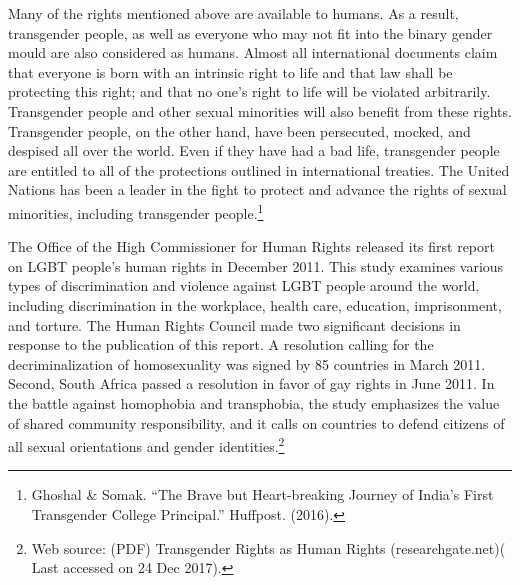 \begin{multicols}{2}


\vspace{-.15cm}

\noi
Many of the rights mentioned above are available to humans. As a result, transgender people,
as well as everyone who may not fit into the binary gender mould are also considered as
humans. Almost all international documents claim that everyone is born with an intrinsic right
to life and that law shall be protecting this right; and that no one's right to life will be violated
arbitrarily. Transgender people and other sexual minorities will also benefit from these rights.
Transgender people, on the other hand, have been persecuted, mocked, and despised all over
the world. Even if they have had a bad life, transgender people are entitled to all of the protections
outlined in international treaties. The United Nations has been a leader in the fight to protect
and advance the rights of sexual minorities, including transgender people.\footnote{Ghoshal \& Somak. “The Brave but Heart-breaking Journey of India’s First Transgender College Principal.” Huffpost. (2016).}

\vspace{-.15cm}

\noi
The Office of the High Commissioner for Human Rights released its first report on LGBT
people's human rights in December 2011. This study examines various types of discrimination
and violence against LGBT people around the world, including discrimination in the
workplace, health care, education, imprisonment, and torture. The Human Rights Council made
two significant decisions in response to the publication of this report. A resolution calling for
the decriminalization of homosexuality was signed by 85 countries in March 2011. Second,
South Africa passed a resolution in favor of gay rights in June 2011. In the battle against
homophobia and transphobia, the study emphasizes the value of shared community
responsibility, and it calls on countries to defend citizens of all sexual orientations and gender
identities.\footnote{Web source: (PDF) Transgender Rights as Human Rights (researchgate.net)( Last accessed on 24 Dec 2017).}

\vspace{-.15cm}


\end{multicols}
